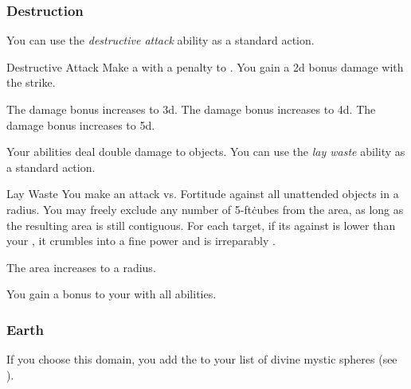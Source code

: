         \subsubsection{Destruction}
             You can use the \textit{destructive attack} ability as a standard action.
            \begin{freeability}{Destructive Attack}
                Make a  with a  penalty to .
                You gain a \plus2d bonus damage with the strike.

                \rankline
                 The damage bonus increases to \plus3d.
                 The damage bonus increases to \plus4d.
                 The damage bonus increases to \plus5d.
            \end{freeability}
             Your abilities deal double damage to objects.
             You can use the \textit{lay waste} ability as a standard action.
            \begin{freeability}{Lay Waste}
                You make an attack vs. Fortitude against all unattended objects in a \areamed radius.
                You may freely exclude any number of 5-ft\. cubes from the area, as long as the resulting area is still contiguous.
                \hit For each target, if its  against  is lower than your , it crumbles into a fine power and is irreparably .

                \rankline
                 The area increases to a \arealarge radius.
            \end{freeability}
             You gain a  bonus to your  with all abilities.

        \subsubsection{Earth}
            If you choose this domain, you add the   to your list of divine mystic spheres (see ).

